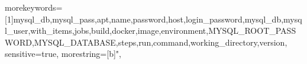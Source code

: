 

\usepackage{varioref}


\usepackage{datetime}


\usepackage{mathtools}



\usepackage[h]{esvect}

\usepackage{array}





\usepackage{listings}
\usepackage{listings-golang}

{
	morekeywords=[1]{mysql_db,mysql_pass,apt,name,password,host,login_password,mysql_db,mysql_user,with_items,jobs,build,docker,image,environment,MYSQL_ROOT_PASSWORD,MYSQL_DATABASE,steps,run,command,working_directory,version},
	sensitive=true,
	morestring=[b]",
}

